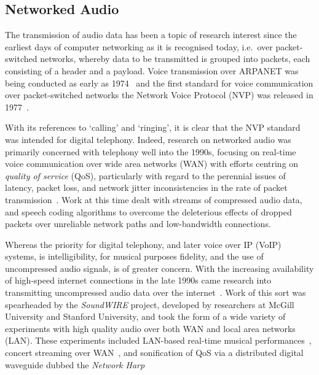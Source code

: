 \subsection{Networked Audio}\label{subsec:networked-audio}

The transmission of audio data has been a topic of research interest since the
earliest days of computer networking as it is recognised today, i.e.\ over
packet-switched networks, whereby data to be transmitted is grouped into
packets, each consisting of a header and a payload.
Voice transmission over ARPANET was being conducted as early as
1974~\citep{schulzrinne_voice_1992} and the first standard for voice
communication over packet-switched networks \textemdash{} the Network Voice
Protocol (NVP) \textemdash{} was released in
1977~\citep{cohen_specifications_1977}.

With its references to `calling' and `ringing', it is clear that the NVP
standard was intended for digital telephony.
Indeed, research on networked audio was primarily concerned with telephony well
into the 1990s, focusing on real-time voice communication over wide area
networks (WAN) with efforts centring on \textit{quality of service} (QoS),
particularly with regard to the perennial issues of latency, packet loss, and
network jitter \textemdash{} inconsistencies in the rate of packet
transmission~\citep{hardman_reliable_1995,hardman_successful_1998}.
Work at this time dealt with streams of compressed audio data, and speech
coding algorithms to overcome the deleterious effects of dropped packets over
unreliable network paths and low-bandwidth connections.

Whereas the priority for digital telephony, and later voice over IP (VoIP)
systems, is intelligibility, for musical purposes fidelity, and the use of
uncompressed audio signals, is of greater concern.
With the increasing availability of high-speed internet connections in the late
1990s came research into transmitting uncompressed audio data over the
internet~\citep{chafe_simplified_2000,xu_real-time_2000}.
Work of this sort was spearheaded by the \textit{SoundWIRE} project, developed
by researchers at McGill University and Stanford University, and took the form
of a wide variety of experiments with high quality audio over both WAN and local
area networks (LAN).
These experiments included LAN-based real-time musical
performances~\citep{chafe_simplified_2000}, concert streaming over
WAN~\citep{xu_real-time_2000,chafe_simplified_2000}, and sonification of QoS via
a distributed digital waveguide dubbed the
\textit{Network Harp}~\citep{chafe_simplified_2000,chafe_physical_2002}

